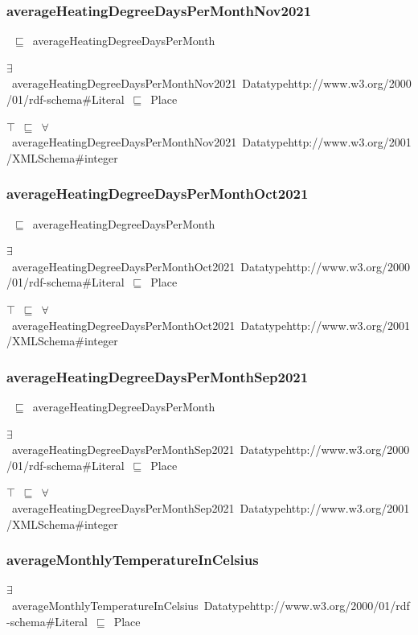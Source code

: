 \documentclass{article}
\begin{document}
\subsubsection*{averageHeatingDegreeDaysPerMonthNov2021}

~\ensuremath{\sqsubseteq}~averageHeatingDegreeDaysPerMonth

\ensuremath{\exists}~averageHeatingDegreeDaysPerMonthNov2021~Datatypehttp://www.w3.org/2000/01/rdf-schema#Literal~\ensuremath{\sqsubseteq}~Place

\ensuremath{\top}~\ensuremath{\sqsubseteq}~\ensuremath{\forall}~averageHeatingDegreeDaysPerMonthNov2021~Datatypehttp://www.w3.org/2001/XMLSchema#integer

\subsubsection*{averageHeatingDegreeDaysPerMonthOct2021}

~\ensuremath{\sqsubseteq}~averageHeatingDegreeDaysPerMonth

\ensuremath{\exists}~averageHeatingDegreeDaysPerMonthOct2021~Datatypehttp://www.w3.org/2000/01/rdf-schema#Literal~\ensuremath{\sqsubseteq}~Place

\ensuremath{\top}~\ensuremath{\sqsubseteq}~\ensuremath{\forall}~averageHeatingDegreeDaysPerMonthOct2021~Datatypehttp://www.w3.org/2001/XMLSchema#integer

\subsubsection*{averageHeatingDegreeDaysPerMonthSep2021}

~\ensuremath{\sqsubseteq}~averageHeatingDegreeDaysPerMonth

\ensuremath{\exists}~averageHeatingDegreeDaysPerMonthSep2021~Datatypehttp://www.w3.org/2000/01/rdf-schema#Literal~\ensuremath{\sqsubseteq}~Place

\ensuremath{\top}~\ensuremath{\sqsubseteq}~\ensuremath{\forall}~averageHeatingDegreeDaysPerMonthSep2021~Datatypehttp://www.w3.org/2001/XMLSchema#integer

\subsubsection*{averageMonthlyTemperatureInCelsius}

\ensuremath{\exists}~averageMonthlyTemperatureInCelsius~Datatypehttp://www.w3.org/2000/01/rdf-schema#Literal~\ensuremath{\sqsubseteq}~Place
\end{document}
